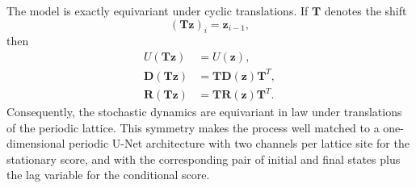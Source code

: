 \documentclass[11pt,twoside,fleqn]{article}
\begin{document}
The model is exactly equivariant under cyclic translations. If \(\bm{T}\) denotes the shift
\begin{equation}
    (\bm{T}\bm{z})_i
    =
    \bm{z}_{i-1},
    \label{eq:cgl_chain_shift_operator}
\end{equation}
then
\begin{align}
    U(\bm{T}\bm{z})
    &=
    U(\bm{z}),
    \\
    \bm{D}(\bm{T}\bm{z})
    &=
    \bm{T}\bm{D}(\bm{z})\bm{T}^T,
    \\
    \bm{R}(\bm{T}\bm{z})
    &=
    \bm{T}\bm{R}(\bm{z})\bm{T}^T.
    \label{eq:cgl_chain_translation_equivariance}
\end{align}
Consequently, the stochastic dynamics are equivariant in law under translations of the periodic lattice. This symmetry makes the process well matched to a one-dimensional periodic U-Net architecture with two channels per lattice site for the stationary score, and with the corresponding pair of initial and final states plus the lag variable for the conditional score.
\end{document}
